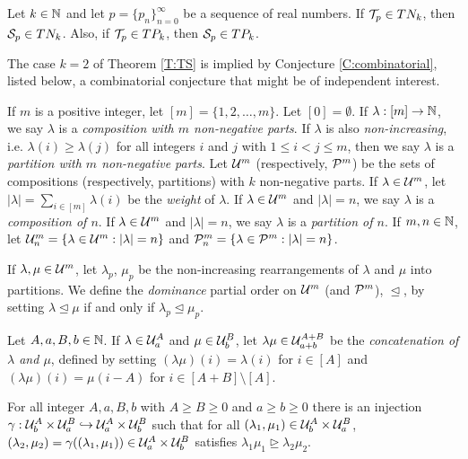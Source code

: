 \documentclass[12pt]{article}
\begin{document}
\begin{theorem}  \label{T:TS}  Let $k \in \mathbb{N}$ and let $p = \{p_n\}_{n=0}^\infty$ be a sequence of real numbers.  If ${\cal T}_p \in TN_k$, then ${\cal S}_p \in TN_k$. Also, if ${\cal T}_p \in TP_k$, then ${\cal S}_p \in TP_k$.
\end{theorem}

The case $k=2$ of Theorem \ref{T:TS} is implied by Conjecture \ref{C:combinatorial}, listed below, a combinatorial conjecture that might be of independent interest. 

If $m$ is a positive integer, let $[m] = \{1,2,\ldots, m\}$.  Let $[0] = \emptyset$.  If $\lambda: [m] \to \mathbb{N}$, we say $\lambda$ is a \emph{composition with $m$ non-negative parts}.  If $\lambda$ is also \emph{non-increasing}, i.e. $\lambda(i) \geq \lambda(j)$ for all integers $i$ and $j$ with $1 \leq i < j \leq m$, then we say $\lambda$ is a \emph{partition with $m$ non-negative parts}.  Let ${\cal U}^m$ (respectively, ${\cal P}^m$) be the sets of compositions (respectively, partitions) with $k$ non-negative parts. If $\lambda \in {\cal U}^m$, let $|\lambda| = \sum_{i \in [m]} \lambda(i)$ be the \emph{weight} of $\lambda$.  If $\lambda \in {\cal U}^m$ and $|\lambda| = n$, we say $\lambda$ is a \emph{composition of $n$}.  If $\lambda \in {\cal U}^m$ and $|\lambda| = n$, we say $\lambda$ is a \emph{partition of $n$}. If $m,n \in \mathbb{N}$, let ${\cal U}^m_n = \{ \lambda \in {\cal U}^m : |\lambda|=n\}$ and ${\cal P}^m_n = \{ \lambda \in {\cal P}^m: |\lambda| =n\}$.

If $\lambda, \mu \in {\cal U}^m$, let $\lambda_p$, $\mu_p$ be the non-increasing rearrangements of $\lambda$ and $\mu$ into partitions.  We define the \emph{dominance} partial order on ${\cal U}^m$ (and ${\cal P}^m$), $\trianglelefteq$, by setting $\lambda \trianglelefteq \mu$ if and only if $\lambda_p \trianglelefteq \mu_p$.

Let $A, a, B, b \in \mathbb{N}$.  If $\lambda \in {\cal U}^A_a$ and $\mu \in {\cal U}^B_b$, let $\lambda\mu \in {\cal U}^{A+B}_{a+b}$ be the \emph{concatenation of $\lambda$ and $\mu$}, defined by setting $(\lambda\mu)(i) = \lambda(i)$ for $i \in [A]$ and $(\lambda\mu)(i) = \mu(i - A)$ for $i \in [A+B] \setminus [A]$.

\begin{conjecture}  \label{C:combinatorial} For all integer $A,a,B,b$ with $A \geq B \geq 0$ and $a \geq b \geq 0$ there is an injection $\gamma: {\cal U}^A_b \times {\cal U}^B_a \hookrightarrow {\cal U}^A_a \times {\cal U}^B_b$ such that for all $(\lambda_1,\mu_1) \in {\cal U}^A_b \times {\cal U}^B_a$, $(\lambda_2,\mu_2) = \gamma((\lambda_1,\mu_1)) \in {\cal U}^A_a \times {\cal U}^B_b$ satisfies $\lambda_1 \mu_1 \trianglerighteq \lambda_2 \mu_2$.
\end{conjecture}
\end{document}

